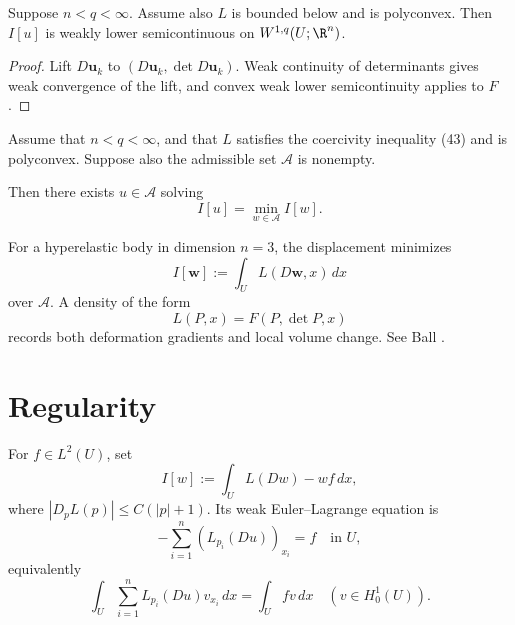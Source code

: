 \begin{theorem}
\label{thm:lower-semicontinuity-polyconvex}
Suppose $n < q < \infty$. Assume also $L$ is bounded below and is polyconvex. Then $I[u]$ is weakly lower semicontinuous on $W^{1,q}(U;\R^n)$.
\end{theorem}

\begin{proof}
\sketch Lift $D\mathbf u_k$ to $(D\mathbf u_k,\det D\mathbf u_k)$. Weak continuity of determinants gives weak convergence of the lift, and convex weak lower semicontinuity applies to $F$.
\end{proof}

\begin{theorem}
\label{thm:existence-minimizer-polyconvex}
Assume that $n < q < \infty$, and that $L$ satisfies the coercivity inequality (43) and is polyconvex. Suppose also the admissible set $\mathcal{A}$ is nonempty.

Then there exists $u \in \mathcal{A}$ solving
\[
I[u] = \min_{w \in \mathcal{A}} I[w].
\]
\end{theorem}

\begin{example}
\label{ex:polyconvexity-nonlinear-elasticity}
For a hyperelastic body in dimension $n=3$, the displacement minimizes
\[
I[\mathbf{w}] := \int_U L(D\mathbf{w}, x)\, dx
\]
over $\mathcal A$. A density of the form
\[
L(P,x)=F(P,\det P,x)
\]
records both deformation gradients and local volume change. See Ball \cite{Ball1977}.
\end{example}

\section{Regularity}
\label{sec:regularity-calculus-of-variations}

For $f\in L^2(U)$, set
\[
I[w]:=\int_U L(Dw)-wf\,dx,
\tag{1}
\]
where $|D_pL(p)|\leq C(|p|+1)$. Its weak Euler--Lagrange equation is
\[
-\sum_{i=1}^n(L_{p_i}(Du))_{x_i}=f\quad\text{in }U,
\tag{3}
\]
equivalently
\[
\int_U\sum_{i=1}^nL_{p_i}(Du)v_{x_i}\,dx=\int_Ufv\,dx
\quad(v\in H_0^1(U)).
\tag{4}
\]

